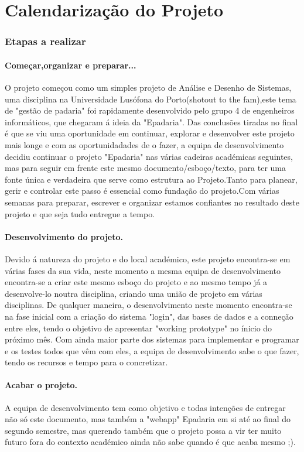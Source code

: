 \chapter{Calendarização do Projeto}
\label{calendarizacao}
\subsection{Etapas a realizar}
\subsubsection{	Começar,organizar e preparar...}
O projeto começou como um simples projeto de Análise e Desenho de Sistemas, uma disciplina na Universidade Lusófona do Porto(shotout to the fam),este tema de "gestão de padaria" foi rapidamente desenvolvido pelo grupo 4 de engenheiros informáticos, que chegaram á ideia da "Epadaria". Das conclusões tiradas no final é que se viu uma oportunidade em continuar, explorar e desenvolver este projeto mais longe e com as oportunidadades de o fazer, a equipa de desenvolvimento decidiu continuar o projeto "Epadaria" nas várias cadeiras académicas seguintes, mas para seguir em frente este mesmo documento/esboço/texto, para ter uma fonte única e verdadeira que serve como estrutura ao Projeto.Tanto para planear, gerir e controlar este passo é essencial como fundação do projeto.Com várias semanas para preparar, escrever e organizar estamos confiantes no resultado deste projeto e que seja tudo entregue a tempo.
\subsubsection{Desenvolvimento do projeto.}
Devido á natureza do projeto e do local académico, este projeto encontra-se em várias fases da sua vida, neste momento a mesma equipa de desenvolvimento encontra-se a criar este mesmo esboço do projeto e ao mesmo tempo já a desenvolve-lo noutra disciplina, criando uma união de projeto em várias disciplinas. De qualquer maneira, o desenvolvimento neste momento encontra-se na fase inicial com a criação do sistema "login", das bases de dados e a conneção entre eles, tendo o objetivo de apresentar "working prototype" no ínicio do próximo mês. Com ainda maior parte dos sistemas para implementar e programar e os testes todos que vêm com eles, a equipa de desenvolvimento sabe o que fazer, tendo os recursos e tempo para o concretizar.
\subsubsection{Acabar o projeto.}
A equipa de desenvolvimento tem como objetivo e todas intenções de entregar não só este documento, mas também a "webapp" Epadaria em si até ao final do segundo semestre, mas querendo também que o projeto possa a vir ter muito futuro fora do contexto académico ainda não sabe quando é que acaba mesmo ;).
